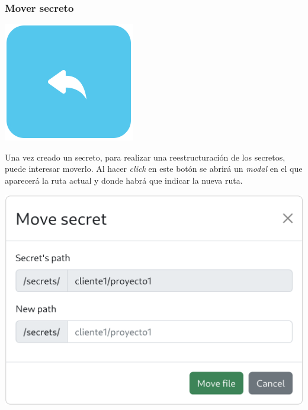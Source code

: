 \documentclass{\ClassPath/viu-tfm-template}
\begin{document}
\subsubsection*{Mover secreto}
{
\begin{minipage}{0.1\linewidth}
    \includegraphics[width=\linewidth]{img/move.png}
\end{minipage}
\hspace{0.5cm}
\begin{minipage}{0.9\linewidth}
    Una vez creado un secreto, para realizar una reestructuración de los secretos, puede interesar moverlo. Al hacer \textit{click} en este botón se abrirá un \textit{modal} en el que aparecerá la ruta actual y donde habrá que indicar la nueva ruta.
\end{minipage}
}
\vspace{-8pt}
\begin{center}
    \includegraphics[width=0.56\linewidth]{img/move-modal.png}
\end{center}
\end{document}
